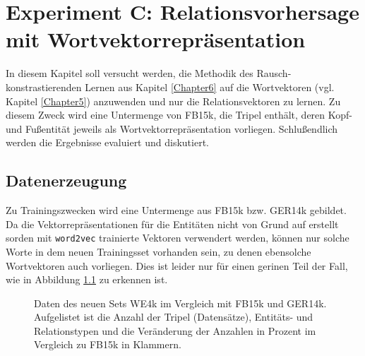 
\chapter{Experiment C: Relationsvorhersage mit Wortvektorrepräsentation} %

\label{Chapter8} %


In diesem Kapitel soll versucht werden, die Methodik des Rausch-konstrastierenden Lernen aus Kapitel \ref{Chapter6}
auf die Wortvektoren (vgl. Kapitel \ref{Chapter5}) anzuwenden und nur die Relationsvektoren zu lernen. Zu diesem Zweck
wird eine Untermenge von FB15k, die Tripel enthält, deren Kopf- und Fußentität jeweils als Wortvektorrepräsentation vorliegen.
Schlußendlich werden die Ergebnisse evaluiert und diskutiert.

\section{Datenerzeugung}

Zu Trainingszwecken wird eine Untermenge aus FB15k bzw. GER14k gebildet. Da
die Vektorrepräsentationen für die Entitäten nicht von Grund auf erstellt sorden mit
\verb|word2vec| trainierte Vektoren verwendert werden, können nur solche Worte in dem
neuen Trainingsset vorhanden sein, zu denen ebensolche Wortvektoren auch vorliegen.
Dies ist leider nur für einen gerinen Teil der Fall, wie in Abbildung \ref{fig:we4k} zu
erkennen ist.

\begin{figure}[h]
  \centering
  \begin{changemargin}{0cm}{0cm}
\end{changemargin}
  \caption[Daten des neuen Relationsdatensets im Vergleich zu FB15k und GER14k]{Daten des neuen Sets WE4k im Vergleich mit
  FB15k und GER14k. Aufgelistet ist die Anzahl der Tripel (Datensätze), Entitäts- und Relationstypen und die Veränderung
  der Anzahlen in Prozent im Vergleich zu FB15k in Klammern.\label{fig:we4k}}
\end{figure}

